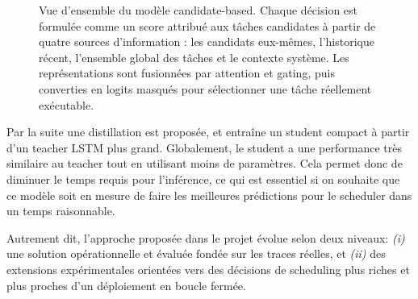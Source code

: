 \documentclass[letterpaper, 10 pt, conference]{ieeeconf}  %
\begin{document}
\begin{figure}[t]
{%
}
\caption{Vue d'ensemble du modèle candidate-based. Chaque décision est formulée comme un score attribué aux tâches candidates à partir de quatre sources d'information : les candidats eux-mêmes, l'historique récent, l'ensemble global des tâches et le contexte système. Les représentations sont fusionnées par attention et gating, puis converties en logits masqués pour sélectionner une tâche réellement exécutable.}
\label{fig:candidate_model}
\end{figure}

Par la suite une distillation est proposée, et entraîne un student compact à partir d'un teacher LSTM plus grand. Globalement, le student a une performance très similaire au teacher tout en utilisant moins de paramètres. Cela permet donc de diminuer le temps requis pour l'inférence, ce qui est essentiel si on souhaite que ce modèle soit en mesure de faire les meilleures prédictions pour le scheduler dans un temps raisonnable.

Autrement dit, l'approche proposée dans le projet évolue selon deux niveaux: \textit{(i)} une solution opérationnelle et évaluée fondée sur les traces réelles, et \textit{(ii)} des extensions expérimentales orientées vers des décisions de scheduling plus riches et plus proches d'un déploiement en boucle fermée.
\end{document}
